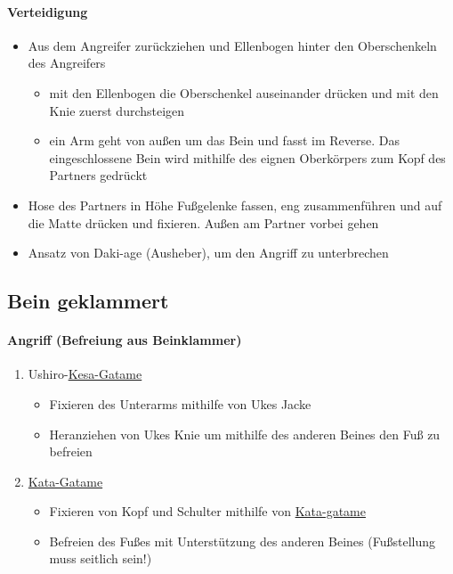 \documentclass[justified, a4paper, notitlepage, captions=tableheading, nobib]{tufte-handout}
\begin{document}
\paragraph{Verteidigung}
\label{sec:org6e77c4d}
\begin{itemize}
\item Aus dem Angreifer zurückziehen und Ellenbogen hinter den Oberschenkeln des Angreifers
\begin{itemize}
\item mit den Ellenbogen die Oberschenkel auseinander drücken und mit den Knie zuerst durchsteigen
\item ein Arm geht von außen um das Bein und fasst im Reverse. Das eingeschlossene Bein wird mithilfe des eignen Oberkörpers zum Kopf des Partners gedrückt
\end{itemize}
\item Hose des Partners in Höhe Fußgelenke fassen, eng zusammenführen und auf die Matte drücken und fixieren. Außen am Partner vorbei gehen
\item Ansatz von Daki-age (Ausheber), um den Angriff zu unterbrechen
\end{itemize}


\subsection{\label{org6e67a55}Bein geklammert }
\label{sec:org8a230d8}
\paragraph{Angriff (Befreiung aus Beinklammer)}
\label{sec:orgf8933c3}
\begin{enumerate}
\item Ushiro-\hyperref[org5004057]{Kesa-Gatame}
\begin{itemize}
\item Fixieren des Unterarms mithilfe von Ukes Jacke
\item Heranziehen von Ukes Knie um mithilfe des anderen Beines den Fuß zu befreien
\end{itemize}
\item \hyperref[org86532d5]{Kata-Gatame}
\begin{itemize}
\item Fixieren von Kopf und Schulter mithilfe von \hyperref[org86532d5]{Kata-gatame}
\item Befreien des Fußes mit Unterstützung des anderen Beines (Fußstellung muss seitlich sein!)
\end{itemize}
\end{enumerate}
\end{document}
